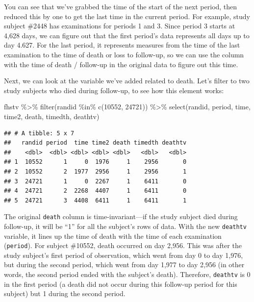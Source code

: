 \documentclass[
]{book}
\newenvironment{Shaded}{\begin{snugshade}}{\end{snugshade}}
\newcommand{\DecValTok}[1]{\textcolor[rgb]{0.00,0.00,0.81}{#1}}
\newcommand{\FunctionTok}[1]{\textcolor[rgb]{0.00,0.00,0.00}{#1}}
\newcommand{\NormalTok}[1]{#1}
\newcommand{\SpecialCharTok}[1]{\textcolor[rgb]{0.00,0.00,0.00}{#1}}
\begin{document}
You can see that we've grabbed the time of the start of the next period, then reduced this by one to get the last time in the current period. For example, study subject \#2448 has examinations for periods 1 and 3. Since period 3 starts at 4,628 days, we can figure out that the first period's data represents all days up to day 4.627. For the last period, it represents measures from the time of the last examination to the time of death or loss to follow-up, so we can use the column with the time of death / follow-up in the original data to figure out this time.

Next, we can look at the variable we've added related to death. Let's filter to two study subjects who died during follow-up, to see how this element works:

\begin{Shaded}
\begin{Highlighting}[]
\NormalTok{fhstv }\SpecialCharTok{\%\textgreater{}\%} 
  \FunctionTok{filter}\NormalTok{(randid }\SpecialCharTok{\%in\%} \FunctionTok{c}\NormalTok{(}\DecValTok{10552}\NormalTok{, }\DecValTok{24721}\NormalTok{)) }\SpecialCharTok{\%\textgreater{}\%} 
  \FunctionTok{select}\NormalTok{(randid, period, time, time2, death, timedth, deathtv)}
\end{Highlighting}
\end{Shaded}

\begin{verbatim}
## # A tibble: 5 x 7
##   randid period  time time2 death timedth deathtv
##    <dbl>  <dbl> <dbl> <dbl> <dbl>   <dbl>   <dbl>
## 1  10552      1     0  1976     1    2956       0
## 2  10552      2  1977  2956     1    2956       1
## 3  24721      1     0  2267     1    6411       0
## 4  24721      2  2268  4407     1    6411       0
## 5  24721      3  4408  6411     1    6411       1
\end{verbatim}

The original \texttt{death} column is time-invariant---if the study subject died during follow-up, it will be ``1'' for all the subject's rows of data. With the new \texttt{deathtv} variable, it lines up the time of death with the time of each examination (\texttt{period}). For subject \#10552, death occurred on day 2,956. This was after the study subject's first period of observation, which went from day 0 to day 1,976, but during the second period, which went from day 1,977 to day 2,956 (in other words, the second period ended with the subject's death). Therefore, \texttt{deathtv} is 0 in the first period (a death did not occur during this follow-up period for this subject) but 1 during the second period.
\end{document}
